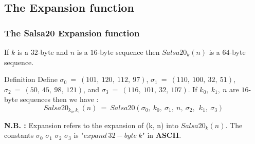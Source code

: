 \subsection{The Expansion function}
\begin{frame}
\frametitle{The Salsa20 Expansion function}

If $k$ is a $32$-byte and $n$ is a $16$-byte sequence then $Salsa20_k(n)$
is a $64$-byte sequence.
\begin{block}{Definition}
Define $\sigma_0 \ = \ (101, \ 120, \ 112, \ 97)$, $\sigma_1 \ = \ (110, \ 100, \ 32, \ 51)$, $\sigma_2 \ = \ (50, \ 45, \ 98, \ 121)$, and
$\sigma_3 \ = \ (116, \ 101, \ 32, \ 107)$. If $k_0, \ k_1, \ n$ are $16$-byte sequences then we have : $$Salsa20_{k_0,k_1} (n) \ = \ Salsa20(\sigma_0, \ k_0, \ \sigma_1, \ n, \ \sigma_2, \ \ k_1, \ \sigma_3)$$
\end{block}
\begin{exampleblock}{}
\textbf{N.B. :} Expansion refers to the expansion of (k, n) into $Salsa20_k(n)$.
The constants  $\sigma_0$ $\sigma_1$ $\sigma_2$ $\sigma_3$ is "$expand \ 32-byte \ k$" in \textbf{ASCII}.
\end{exampleblock}
\end{frame}